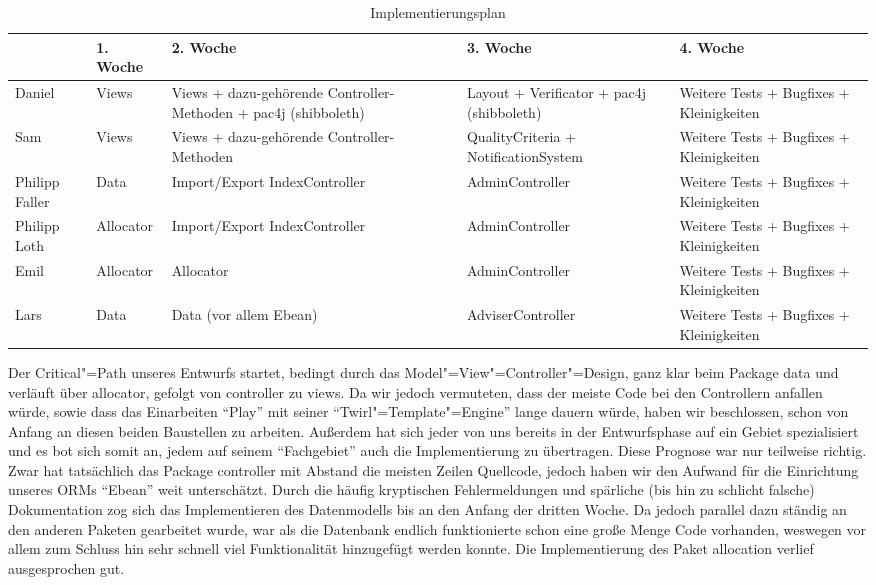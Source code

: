 \documentclass[parskip=full]{scrartcl}
\newcommand{\code}[1]{{\ttfamily #1}}
\begin{document}
\begin{table}[H]
\begin{tabularx}{\textwidth}{|l|l|X|X|X|}
\hline
 	& 1. Woche			& 2. Woche		& 3. Woche & 4. Woche\\
\hline 
Daniel	& Views			& Views + dazu-gehörende Controller-Methoden + pac4j 
(shibboleth) & Layout + Verificator
+ pac4j (shibboleth)& Weitere Tests +
Bugfixes +
Kleinigkeiten\\
\hline
Sam & Views&Views +
dazu-gehörende
Controller-
Methoden & QualityCriteria +
NotificationSystem & Weitere Tests +
Bugfixes +
Kleinigkeiten\\
\hline
Philipp Faller&Data&Import/Export
IndexController&AdminController&Weitere Tests +
Bugfixes +
Kleinigkeiten\\
\hline
Philipp Loth&Allocator&Import/Export
IndexController&AdminController&Weitere Tests +
Bugfixes +
Kleinigkeiten\\
\hline
Emil&Allocator&Allocator&AdminController&Weitere Tests +
Bugfixes +
Kleinigkeiten\\
\hline
Lars&Data&Data (vor allem
Ebean)&AdviserController&Weitere Tests +
Bugfixes +
Kleinigkeiten\\
\hline
\end{tabularx}
\caption{Implementierungsplan}
\end{table}
Der Critical"=Path unseres Entwurfs startet, bedingt durch das Model"=View"=Controller"=Design, ganz klar beim Package \code{data} und verläuft über \code{allocator}, gefolgt von \code{controller} zu  \code{views}.
Da wir jedoch vermuteten, dass der meiste Code bei den Controllern anfallen würde, sowie dass das Einarbeiten \enquote{Play} mit seiner \enquote{Twirl"=Template"=Engine} lange dauern würde, haben wir beschlossen, schon von Anfang an diesen beiden Baustellen zu arbeiten. 
Außerdem hat sich jeder von uns bereits in der Entwurfsphase auf ein Gebiet spezialisiert und es bot sich somit an, jedem auf seinem \enquote{Fachgebiet} auch die Implementierung zu übertragen.
Diese Prognose war nur teilweise richtig.
Zwar hat tatsächlich das Package \code{controller} mit Abstand die meisten Zeilen Quellcode, jedoch haben wir den Aufwand für die Einrichtung unseres ORMs \enquote{Ebean} weit unterschätzt. 
Durch die häufig kryptischen Fehlermeldungen und spärliche (bis hin zu schlicht falsche) Dokumentation zog sich das Implementieren des Datenmodells bis an den Anfang der dritten Woche. 
Da jedoch parallel dazu ständig an den anderen Paketen gearbeitet wurde, war als die Datenbank endlich funktionierte schon eine große Menge Code vorhanden, weswegen vor allem zum Schluss hin sehr schnell viel Funktionalität hinzugefügt werden konnte.
Die Implementierung des Paket \code{allocation} verlief ausgesprochen gut.
\end{document}
